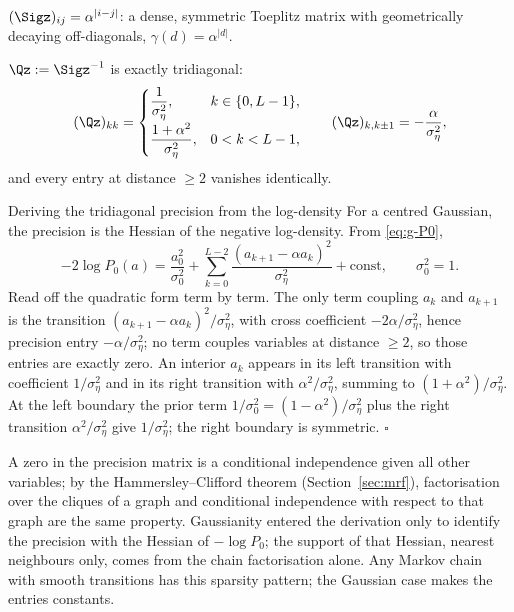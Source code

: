 \begin{proposition}\label{prop:g-Sigma0}
$(\Sigz)_{ij} = \alpha^{|i-j|}$: a dense, symmetric Toeplitz matrix with
geometrically decaying off-diagonals, $\gamma(d) = \alpha^{|d|}$.
\end{proposition}

\begin{proposition}\label{prop:g-Q0}
$\Qz := \Sigz^{-1}$ is exactly tridiagonal:
\begin{equation}
  (\Qz)_{kk} =
  \begin{cases}
    \dfrac{1}{\sigma_\eta^2}, & k \in \{0, L-1\},\\[8pt]
    \dfrac{1+\alpha^2}{\sigma_\eta^2}, & 0 < k < L-1,
  \end{cases}
  \qquad
  (\Qz)_{k, k\pm 1} = -\frac{\alpha}{\sigma_\eta^2},
  \label{eq:g-Q0}
\end{equation}
and every entry at distance $\geq 2$ vanishes identically.
\end{proposition}

\begin{toolbox}{Deriving the tridiagonal precision from the log-density}
For a centred Gaussian, the precision is the Hessian of the negative
log-density. From \eqref{eq:g-P0},
\begin{equation*}
  -2 \log P_0(a)
  = \frac{a_0^2}{\sigma_0^2}
  + \sum_{k=0}^{L-2} \frac{(a_{k+1} - \alpha a_k)^2}{\sigma_\eta^2}
  + \text{const},
  \qquad \sigma_0^2 = 1 .
\end{equation*}
Read off the quadratic form term by term. The only term coupling $a_k$ and
$a_{k+1}$ is the transition $(a_{k+1} - \alpha a_k)^2/\sigma_\eta^2$, with
cross coefficient $-2\alpha/\sigma_\eta^2$, hence precision entry
$-\alpha/\sigma_\eta^2$; no term couples variables at distance $\geq 2$,
so those entries are exactly zero. An interior $a_k$ appears in its left
transition with coefficient $1/\sigma_\eta^2$ and in its right transition
with $\alpha^2/\sigma_\eta^2$, summing to $(1+\alpha^2)/\sigma_\eta^2$. At
the left boundary the prior term $1/\sigma_0^2 = (1-\alpha^2)/\sigma_\eta^2$
plus the right transition $\alpha^2/\sigma_\eta^2$ give $1/\sigma_\eta^2$;
the right boundary is symmetric. \hfill$\square$
\end{toolbox}

\begin{remark}
\label{rmk:g-markov-sparsity}
A zero in the precision matrix is a conditional independence given all
other variables; by the Hammersley--Clifford theorem
(Section~\ref{sec:mrf}), factorisation over the cliques of a graph and
conditional independence with respect to that graph are the same property.
Gaussianity entered the derivation only to identify the precision with the
Hessian of $-\log P_0$; the support of that Hessian, nearest neighbours
only, comes from the chain factorisation alone. Any Markov chain with
smooth transitions has this sparsity pattern; the Gaussian case makes the
entries constants.
\end{remark}

